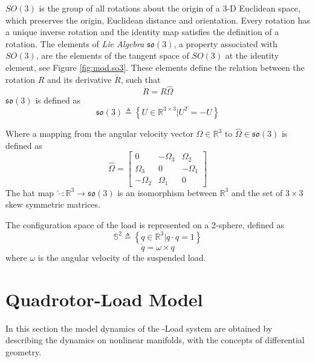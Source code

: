$ SO(3) $ is the group of all rotations about the origin of a 3-D Euclidean space, which preserves the origin, Euclidean distance and orientation.
Every rotation has a unique inverse rotation and the identity map satisfies the definition of a rotation. The elements of \textit{Lie Algebra} $ \mathfrak{so}(3) $, a property associated with $ SO(3) $, are the elements of the tangent space of $ SO(3) $ at the identity element, see Figure \ref{fig:mod.so3}. 
These elements define the relation between the rotation $ R $ and its derivative $ \dot{R} $, such that
\begin{equation}\label{key}
\dot{R} = R\hat{\Omega}
\end{equation}
$ \mathfrak{so}(3) $ is defined as
\begin{equation}\label{key}
\mathfrak{so}(3) \triangleq \left\lbrace U\in \mathbb{R}^{3\times 3}|U^T=-U\right\rbrace
\end{equation}

Where a mapping from the angular velocity vector $ \Omega\in\mathbb{R}^3 $ to $ \hat{\Omega}\in\mathfrak{so}(3) $ is defined as \cite{Murray1994}
\begin{equation}\label{eq:mod.hatOmega}
\hat{\Omega}=\begin{bmatrix}
0&-\Omega_3&\Omega_2\\
\Omega_3&0&-\Omega_1\\
-\Omega_2&\Omega_1&0
\end{bmatrix}
\end{equation}
The hat map $ \hat{\cdot}:\mathbb{R}^3\rightarrow \mathfrak{so}(3)$ is an isomorphism between $ \mathbb{R}^3 $ and the set of $ 3\times 3 $ skew symmetric matrices.

The configuration space of the load is represented on a 2-sphere, defined as
\begin{equation}\label{key}
\mathbb{S}^2 \triangleq \left\lbrace q\in\mathbb{R}^{3}|q\cdot q=1\right\rbrace 
\end{equation}
\begin{equation}\label{key}
\dot{q} = \omega\times q
\end{equation}
where $ \omega $ is the angular velocity of the suspended load.

\section{Quadrotor-Load Model}	\label{sec:mod.QRLmod}
In this section the model dynamics of the -Load system are obtained by describing the dynamics on nonlinear manifolds, with the concepts of differential geometry. 

